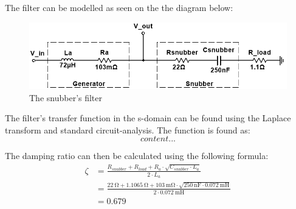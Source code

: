 The filter can be modelled as seen on the the diagram below:
\begin{figure}[H]
	\centering
	\includegraphics[width=0.9\linewidth]{Hardware/LoadSystem/SnubberFilter}
	\caption{The snubber's filter}
	\label{fig:SnubberFilter}
\end{figure}

The filter's transfer function in the s-domain can be found using the Laplace transform and standard circuit-analysis. The function is found as:
\begin{equation}
	content...
\end{equation}

The damping ratio can then be calculated using the following formula:
\begin{equation}
	\begin{split}
		\zeta &= \frac{R_{snubber} + R_{load} + R_a \cdot \sqrt{C_{snubber} \cdot  L_a}}{2 \cdot L_a}\\
		&= \frac{\SI{22}{\ohm} + \SI{1.1065}{\ohm} + \SI{103}{\milli \ohm} \cdot \sqrt{\SI{250}{\nano \farad} \cdot \SI{0.072}{\milli \henry}}}{2 \cdot \SI{0.072}{\milli \henry}}\\
		&= 0.679
	\end{split}
\end{equation}